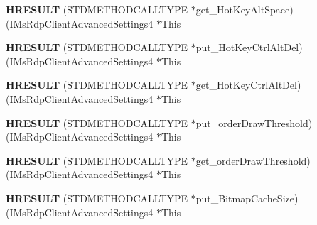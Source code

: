\begin{DoxyCompactItemize}
\item 
\mbox{\label{struct_i_ms_rdp_client_advanced_settings4_vtbl_a55e589a619a18988270e097acce09903}} 
{\bfseries H\+R\+E\+S\+U\+LT} (S\+T\+D\+M\+E\+T\+H\+O\+D\+C\+A\+L\+L\+T\+Y\+PE $\ast$get\+\_\+\+Hot\+Key\+Alt\+Space)(I\+Ms\+Rdp\+Client\+Advanced\+Settings4 $\ast$This
\item 
\mbox{\label{struct_i_ms_rdp_client_advanced_settings4_vtbl_a0833c8dd55d5daee11498c0ef6aa9050}} 
{\bfseries H\+R\+E\+S\+U\+LT} (S\+T\+D\+M\+E\+T\+H\+O\+D\+C\+A\+L\+L\+T\+Y\+PE $\ast$put\+\_\+\+Hot\+Key\+Ctrl\+Alt\+Del)(I\+Ms\+Rdp\+Client\+Advanced\+Settings4 $\ast$This
\item 
\mbox{\label{struct_i_ms_rdp_client_advanced_settings4_vtbl_ac7c25b629e647649bacf7c445fe28c8a}} 
{\bfseries H\+R\+E\+S\+U\+LT} (S\+T\+D\+M\+E\+T\+H\+O\+D\+C\+A\+L\+L\+T\+Y\+PE $\ast$get\+\_\+\+Hot\+Key\+Ctrl\+Alt\+Del)(I\+Ms\+Rdp\+Client\+Advanced\+Settings4 $\ast$This
\item 
\mbox{\label{struct_i_ms_rdp_client_advanced_settings4_vtbl_ad1f91b1038af1c12ff4af5e923088e7b}} 
{\bfseries H\+R\+E\+S\+U\+LT} (S\+T\+D\+M\+E\+T\+H\+O\+D\+C\+A\+L\+L\+T\+Y\+PE $\ast$put\+\_\+order\+Draw\+Threshold)(I\+Ms\+Rdp\+Client\+Advanced\+Settings4 $\ast$This
\item 
\mbox{\label{struct_i_ms_rdp_client_advanced_settings4_vtbl_a751b28bec60df06f767ebb1bdba47a67}} 
{\bfseries H\+R\+E\+S\+U\+LT} (S\+T\+D\+M\+E\+T\+H\+O\+D\+C\+A\+L\+L\+T\+Y\+PE $\ast$get\+\_\+order\+Draw\+Threshold)(I\+Ms\+Rdp\+Client\+Advanced\+Settings4 $\ast$This
\item 
\mbox{\label{struct_i_ms_rdp_client_advanced_settings4_vtbl_a78252025defe22605037c0d936b59275}} 
{\bfseries H\+R\+E\+S\+U\+LT} (S\+T\+D\+M\+E\+T\+H\+O\+D\+C\+A\+L\+L\+T\+Y\+PE $\ast$put\+\_\+\+Bitmap\+Cache\+Size)(I\+Ms\+Rdp\+Client\+Advanced\+Settings4 $\ast$This
\item 
\mbox{\label{struct_i_ms_rdp_client_advanced_settings4_vtbl_a38db615c2de2158bb538d771661db2e8}} 

\end{DoxyCompactItemize}
